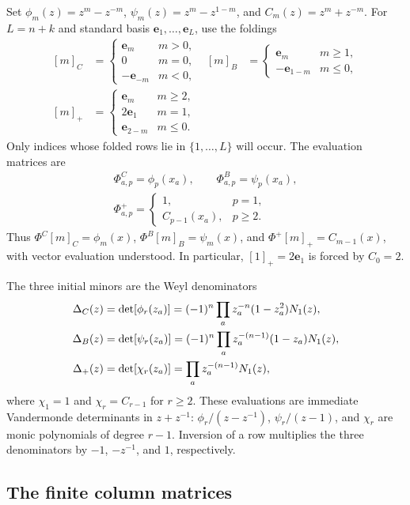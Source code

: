 \documentclass[12pt]{article}
\numberwithin{equation}{section}
\newcommand{\ph}{\phi}
\newcommand{\ps}{\psi}
\newcommand{\eb}{\mathbf e}
\begin{document}
Set $\ph_m(z)=z^m-z^{-m}$, $\ps_m(z)=z^m-z^{1-m}$, and
$C_m(z)=z^m+z^{-m}$.
For $L=n+k$ and standard basis $\eb_1,\ldots,\eb_L$, use the foldings
\[
\begin{aligned}
 [m]_C&=\begin{cases}\eb_m&m>0,\\0&m=0,\\-\eb_{-m}&m<0,\end{cases}
 & [m]_B&=\begin{cases}\eb_m&m\ge1,\\-\eb_{1-m}&m\le0,\end{cases}\\
 [m]_+&=\begin{cases}\eb_m&m\ge2,\\2\eb_1&m=1,\\\eb_{2-m}&m\le0.\end{cases}
\end{aligned}
\]
Only indices whose folded rows lie in $\{1,\ldots,L\}$ will occur.
The evaluation matrices are
\[
\begin{gathered}
 \Phi^C_{a,p}=\ph_p(x_a),\qquad \Phi^B_{a,p}=\ps_p(x_a),\\[2pt]
 \Phi^+_{a,p}=\begin{cases}
 1,&p=1,\\
 C_{p-1}(x_a),&p\ge2.
 \end{cases}
\end{gathered}
\]
Thus $\Phi^C[m]_C=\ph_m(x)$, $\Phi^B[m]_B=\ps_m(x)$,
and $\Phi^+[m]_+=C_{m-1}(x)$, with vector evaluation understood.
In particular, $[1]_+=2\eb_1$ is forced by $C_0=2$.

The three initial minors are the Weyl denominators
\begin{align}
 \Delta_C(z)&=\det[\ph_r(z_a)]
 =(-1)^n\prod_a z_a^{-n}(1-z_a^2)N_1(z),\notag\\
 \Delta_B(z)&=\det[\ps_r(z_a)]
 =(-1)^n\prod_a z_a^{-(n-1)}(1-z_a)N_1(z),\label{eq:denominators}\\
 \Delta_+(z)&=\det[\chi_r(z_a)]
 =\prod_a z_a^{-(n-1)}N_1(z),\notag
\end{align}
where $\chi_1=1$ and $\chi_r=C_{r-1}$ for $r\ge2$.
These evaluations are immediate Vandermonde determinants in $z+z^{-1}$:
$\ph_r/(z-z^{-1})$, $\ps_r/(z-1)$, and $\chi_r$ are monic
polynomials of degree $r-1$.  Inversion of a row multiplies the three
denominators by $-1$, $-z^{-1}$, and $1$, respectively.

\subsection{The finite column matrices}
\end{document}
